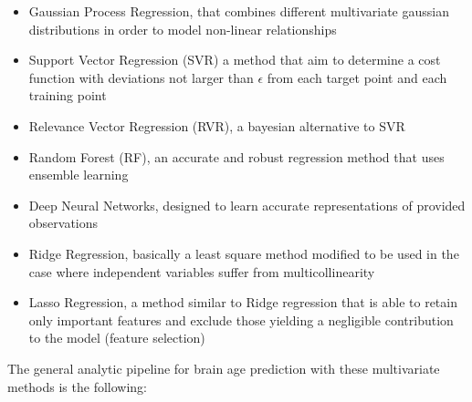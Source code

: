 \documentclass{article}
\begin{document}
	\begin{itemize}
		\item Gaussian Process Regression, that combines different multivariate gaussian distributions in order to model non-linear relationships
		\item Support Vector Regression (SVR) a method that aim to determine a cost function with deviations not larger than $\epsilon$ from each target point and each training point
		\item Relevance Vector Regression (RVR), a bayesian alternative to SVR 
		\item Random Forest (RF), an accurate and robust regression method that uses ensemble learning
		\item  Deep Neural Networks, designed to learn accurate representations of provided observations
		\item Ridge Regression, basically a least square method modified to be used in the case where independent variables suffer from multicollinearity
		\item Lasso Regression, a method similar to Ridge regression that is able to retain only important features and exclude those yielding a negligible contribution to the model (feature selection)
	\end{itemize}
	The general analytic pipeline for brain age prediction with these multivariate methods is the following:
\end{document}
